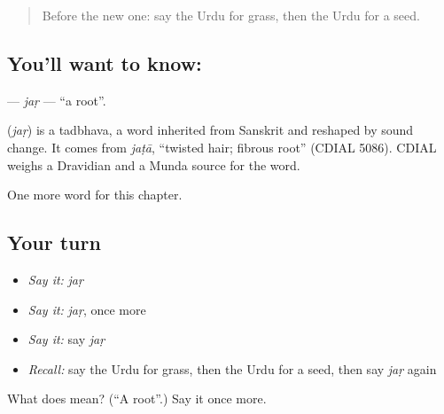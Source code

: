 \begin{quote}
Before the new one: say the Urdu for grass, then the Urdu for a seed.
\end{quote}

\subsection*{You'll want to know: }
\textbf{} — \emph{jaṛ} — \textquotedblleft{}a root\textquotedblright{}.

\begin{cousinweb}
\textbf{} (\emph{jaṛ}) is a tadbhava, a word inherited from Sanskrit and reshaped by sound change. It comes from \emph{jaṭā}, \textquotedblleft{}twisted hair; fibrous root\textquotedblright{} (CDIAL 5086). CDIAL weighs a Dravidian and a Munda source for the word.
\end{cousinweb}

\begin{grammarlens}[title={What you've built}]
One more word for this chapter.
\end{grammarlens}

\subsection*{Your turn}
\begin{itemize}
\raggedright
  \item \emph{Say it:} \emph{jaṛ}
  \item \emph{Say it:} \emph{jaṛ}, once more
  \item \emph{Say it:} say \emph{jaṛ}
  \item \emph{Recall:} say the Urdu for grass, then the Urdu for a seed, then say \emph{jaṛ} again
\end{itemize}

\begin{tcolorbox}[breakable,colback=teal!4,colframe=teal!35!black,title={Before you move on}]
What does  mean? (\textquotedblleft{}A root\textquotedblright{}.) Say it once more.
\end{tcolorbox}
